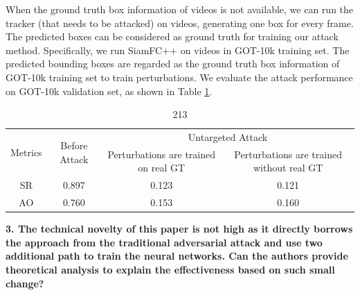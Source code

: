 \documentclass[12pt]{article}
\begin{document}

When the ground truth box information of videos is not available, we can run the tracker (that needs to be attacked) on videos, generating one box for every frame. The predicted boxes can be considered as ground truth for training our attack method.
Specifically, we run SiamFC++ on videos in GOT-10k training set. The predicted bounding boxes are regarded as the ground truth box information of GOT-10k training set to train perturbations. We evaluate the attack performance on GOT-10k validation set, as shown in Table \ref{tab:agent}.

\begin{table}
    \centering
    \caption{213}
    \begin{tabular}{cccc}
        \toprule
        \multirow{2}{*}{Metrics} & \multirow{2}{*}{Before Attack} & \multicolumn{2}{c}{Untargeted Attack}                                            \\
                                 &                                & Perturbations are trained on real GT & Perturbations are trained without real GT \\ \midrule
        SR                       & 0.897                          & 0.123                                & 0.121                                     \\
        AO                       & 0.760                          & 0.153                                & 0.160                                     \\                              
        \bottomrule
    \end{tabular}
    \label{tab:agent}
\end{table}

\noindent \textbf{3. The technical novelty of this paper is not high as it directly borrows the approach from the traditional adversarial attack and use two additional path to train the neural networks. Can the authors provide theoretical analysis to explain the effectiveness based on such small change?}
\end{document}
